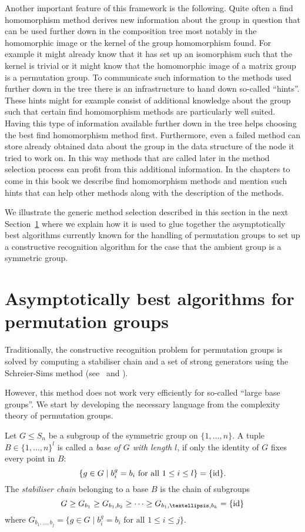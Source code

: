 Another important feature of this framework is the following. Quite often
a find homomorphism method derives new information about the group in
question that can be used further down in the composition tree most notably
in the homomorphic image or the kernel of the group homomorphism found.
For example it might already know that it has set up an isomorphism such
that the kernel is trivial or it might know that the homomorphic image of a
matrix group is a permutation group. To communicate such information to the
methods used further down in the tree there is an infrastructure to hand
down so-called ``hints''. These hints might for example consist of additional
knowledge about the group such that certain find homomorphism methods
are particularly well suited. Having this type of information available
further down in the tree helps choosing the best find homomorphism method
first. Furthermore, even a failed method can store already 
obtained data about the group in the data structure of the node it tried
to work on. In this way methods that are called later in the method
selection process can profit from this additional information. In the
chapters to come in this book we describe find homomorphism methods
and mention such hints that can help other methods along with the
description of the methods.

We illustrate the generic method selection described in this section
in the next Section~\ref{permgrps} where we explain how it is used to
glue together the asymptotically best algorithms currently known for
the handling of permutation groups to set up a constructive recognition
algorithm for the case that the ambient group is a symmetric group.


\section{Asymptotically best algorithms for permutation groups}
\label{permgrps}

Traditionally, the constructive recognition problem for permutation
groups is solved by computing a stabiliser chain and a set of strong
generators using the Schreier-Sims method (see~\cite{Si} and \cite{Ser}). 

However, this method does not work very efficiently for so-called
``large base groups''. We start by developing the necessary language
from the complexity theory of permutation groups.

\begin{Def}
Let $G \le S_n$ be a subgroup of the symmetric group on $\{1,\ldots,n\}$.
A tuple $B \in \{ 1, \ldots, n\}^l$ is called a \emph{base of $G$ with
length $l$}, if only the identity of $G$ fixes every point in $B$: 
\[ \{ g \in G \mid b_i^g = b_i \mbox{ for all } 1 \le i \le l \} = \{ \id \}. \]
The \emph{stabiliser chain} belonging to a base $B$ is the chain of
subgroups
\[ G \ge G_{b_1} \ge G_{b_1,b_2} \ge \cdots \ge G_{b_1,\ldots,b_k} =
\{\id\} \]
where $G_{b_1, \ldots, b_j} =
\{ g \in G \mid b_i^g = b_i \mbox{ for all } 1 \le i \le j \}$.
\end{Def}

